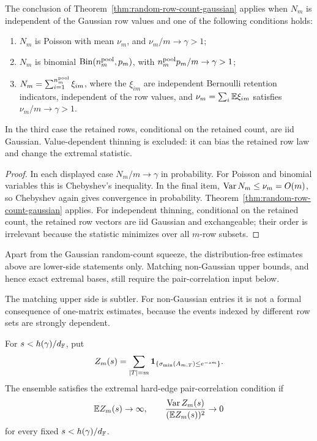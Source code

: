 \begin{corollary}\label{cor:poisson-thinning}
The conclusion of Theorem~\ref{thm:random-row-count-gaussian} applies when
\(N_m\) is independent of the Gaussian row values and one of the following
conditions holds:
\begin{enumerate}
\item \(N_m\) is Poisson with mean \(\nu_m\), and \(\nu_m/m\to\gamma>1\);
\item \(N_m\) is binomial \(\operatorname{Bin}(n_m^{\rm pool},p_m)\), with
      \(n_m^{\rm pool}p_m/m\to\gamma>1\);
\item \(N_m=\sum_{i=1}^{n_m^{\rm pool}}\xi_{im}\), where the \(\xi_{im}\) are independent
      Bernoulli retention indicators, independent of the row values, and
      \(\nu_m=\sum_i\mathbb{E}\xi_{im}\) satisfies \(\nu_m/m\to\gamma>1\).
\end{enumerate}
In the third case the retained rows, conditional on the retained count, are iid
Gaussian.  Value-dependent thinning is excluded: it can bias the retained row
law and change the extremal statistic.
\end{corollary}

\begin{proof}
In each displayed case \(N_m/m\to\gamma\) in probability.  For Poisson and
binomial variables this is Chebyshev's inequality.  In the final item,
\(\operatorname{Var} N_m\le\nu_m=O(m)\), so Chebyshev again gives convergence in probability.
Theorem~\ref{thm:random-row-count-gaussian} applies.  For independent thinning,
conditional on the retained count, the retained row vectors are iid Gaussian
and exchangeable; their order is irrelevant because the statistic minimizes
over all \(m\)-row subsets.
\end{proof}

Apart from the Gaussian random-count squeeze, the distribution-free estimates
above are lower-side statements only.  Matching non-Gaussian upper bounds, and
hence exact extremal bases, still require the pair-correlation input below.

The matching upper side is subtler.  For non-Gaussian entries it is not a
formal consequence of one-matrix estimates, because the events indexed by
different row sets are strongly dependent.

\begin{definition}
For \(s<h(\gamma)/d_{\mathbb{F}}\), put
\[
  Z_m(s)=\sum_{|T|=m}\mathbf{1}_{\{\sigma_{\min}(A_{m,T})\le e^{-sm}\}}.
\]
The ensemble satisfies the extremal hard-edge pair-correlation condition if
\[
  \mathbb{E} Z_m(s)\to\infty,
  \qquad
  \frac{\operatorname{Var} Z_m(s)}{(\mathbb{E} Z_m(s))^2}\to0
\]
for every fixed \(s<h(\gamma)/d_{\mathbb{F}}\).
\end{definition}

